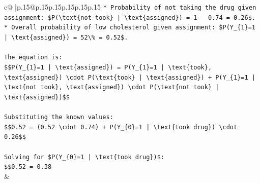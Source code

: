\documentclass{article}
\begin{document}
{\begin{supertabular}{c@{$\;$}|p{.15\linewidth}@{}p{.15\linewidth}p{.15\linewidth}p{.15\linewidth}p{.15\linewidth}p{.15\linewidth}}
{{{\texttt{*   Probability of not taking the drug given assignment: \$P(\textbackslash{}text\{not took\} | \textbackslash{}text\{assigned\}) = 1 {-} 0.74 = 0.26\$.} \\
\texttt{*   Overall probability of low cholesterol given assignment: \$P(Y\_\{1\}=1 | \textbackslash{}text\{assigned\}) = 52\textbackslash{}\% = 0.52\$.} \\
\\ 
\texttt{The equation is:} \\
\texttt{\$\$P(Y\_\{1\}=1 | \textbackslash{}text\{assigned\}) = P(Y\_\{1\}=1 | \textbackslash{}text\{took\}, \textbackslash{}text\{assigned\}) \textbackslash{}cdot P(\textbackslash{}text\{took\} | \textbackslash{}text\{assigned\}) + P(Y\_\{1\}=1 | \textbackslash{}text\{not took\}, \textbackslash{}text\{assigned\}) \textbackslash{}cdot P(\textbackslash{}text\{not took\} | \textbackslash{}text\{assigned\})\$\$} \\
\\ 
\texttt{Substituting the known values:} \\
\texttt{\$\$0.52 = (0.52 \textbackslash{}cdot 0.74) + P(Y\_\{0\}=1 | \textbackslash{}text\{took drug\}) \textbackslash{}cdot 0.26\$\$} \\
\\ 
\texttt{Solving for \$P(Y\_\{0\}=1 | \textbackslash{}text\{took drug\})\$:} \\
\texttt{\$\$0.52 = 0.38} \\
            }
        }
    }
    & \\ \\


\end{supertabular}}
\end{document}

